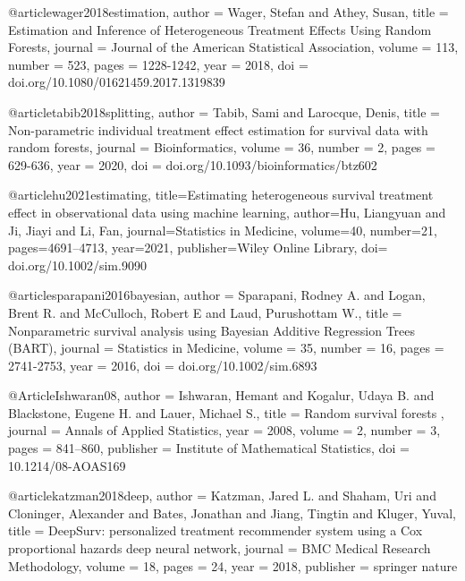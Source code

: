 @article{wager2018estimation,
  author = {Wager, Stefan and Athey, Susan},
  title = {Estimation and Inference of Heterogeneous Treatment Effects Using Random Forests},
  journal = {Journal of the American Statistical Association},
  volume = {113},
  number = {523},
  pages = {1228-1242},
  year = {2018},
  doi = {doi.org/10.1080/01621459.2017.1319839}
}





@article{tabib2018splitting,
  author = {Tabib, Sami and Larocque, Denis},
  title = {Non-parametric individual treatment effect estimation for survival data with random forests},
  journal = {Bioinformatics},
  volume = {36},
  number = {2},
  pages = {629-636},
  year = {2020},
  doi = {doi.org/10.1093/bioinformatics/btz602}
}





@article{hu2021estimating,
  title={Estimating heterogeneous survival treatment effect in observational data using machine learning},
  author={Hu, Liangyuan and Ji, Jiayi and Li, Fan},
  journal={Statistics in Medicine},
  volume={40},
  number={21},
  pages={4691--4713},
  year={2021},
  publisher={Wiley Online Library},
  doi= {doi.org/10.1002/sim.9090}
}





@article{sparapani2016bayesian,
  author = {Sparapani, Rodney A. and Logan, Brent R. and McCulloch, Robert E and Laud, Purushottam W.},
  title = {Nonparametric survival analysis using Bayesian Additive Regression Trees (BART)},
  journal = {Statistics in Medicine},
  volume = {35},
  number = {16},
  pages = {2741-2753},
  year = {2016},
  doi = {doi.org/10.1002/sim.6893}
}





@Article{Ishwaran08,
   author = {Ishwaran, Hemant and Kogalur, Udaya B. and Blackstone, Eugene H. and Lauer, Michael S.},
   title = { Random survival forests },
   journal = {Annals of Applied Statistics},
   year = {2008},
   volume = {2},
   number = {3},
   pages = {841--860},
   publisher = {Institute of Mathematical Statistics},
   doi = {10.1214/08-AOAS169}
 }







@article{katzman2018deep,
  author = {Katzman, Jared L. and Shaham, Uri and Cloninger, Alexander and Bates, Jonathan and Jiang, Tingtin and Kluger, Yuval},
  title = {DeepSurv: personalized treatment recommender system using a Cox proportional hazards deep neural network},
  journal = {BMC Medical Research Methodology},
  volume = {18},
  pages = {24},
  year = {2018},
  publisher = {springer nature}
}






